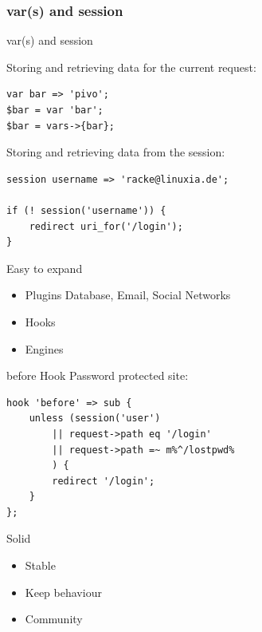 \subsubsection{var(s) and session}
\begin{frame}[fragile]{var(s) and session}

Storing and retrieving data for the current request:

\begin{lstlisting}
var bar => 'pivo';
$bar = var 'bar';
$bar = vars->{bar};
\end{lstlisting}

Storing and retrieving data from the session:

\begin{lstlisting}
session username => 'racke@linuxia.de';

if (! session('username')) {
    redirect uri_for('/login');
}
\end{lstlisting}

\end{frame}

\begin{frame}{Easy to expand}
\begin{itemize}
\item Plugins
      Database, Email, Social Networks
\item Hooks
\item Engines
\end{itemize}
\end{frame}

\begin{frame}[fragile]{before Hook}
Password protected site:
\begin{lstlisting}
hook 'before' => sub {
    unless (session('user')
        || request->path eq '/login'
        || request->path =~ m%^/lostpwd%
        ) {
        redirect '/login';
    }
};
\end{lstlisting}
\end{frame}

\begin{frame}{Solid}
\begin{itemize}
\item Stable
\item Keep behaviour
\item Community
\end{itemize}
\end{frame}


